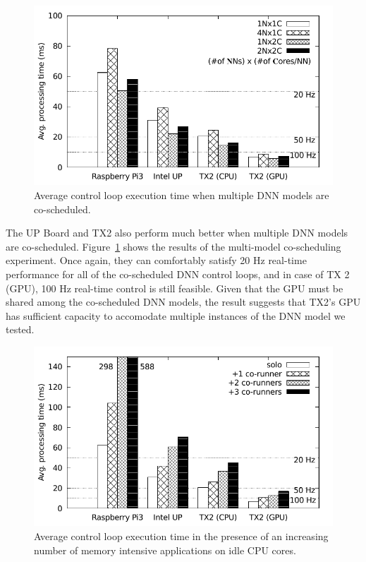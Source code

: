 \begin{figure}[h]
  \centering
  \includegraphics[width=.45\textwidth]{figs/compare_model}
  \caption{Average control loop execution time when multiple DNN
    models are co-scheduled. }
  \label{fig:sys_model}
\end{figure}

The UP Board and TX2 also perform much better when multiple DNN models
are co-scheduled. Figure~\ref{fig:sys_model} shows the results of the
multi-model co-scheduling experiment. Once again, they can comfortably
satisfy 20 Hz real-time performance for all of the co-scheduled DNN control
loops, and in case of TX 2 (GPU), 100 Hz real-time control is still
feasible. Given that the GPU must be shared among the co-scheduled DNN
models, the result suggests that TX2's GPU has sufficient capacity to
accomodate multiple instances of the DNN model we tested.


\begin{figure}[h]
  \centering
  \includegraphics[width=.45\textwidth]{figs/compare_benchmark}
  \caption{Average control loop execution time in the presence of an
    increasing number of memory intensive applications on idle CPU cores.}
  \label{fig:sys_bench}
\end{figure} 

